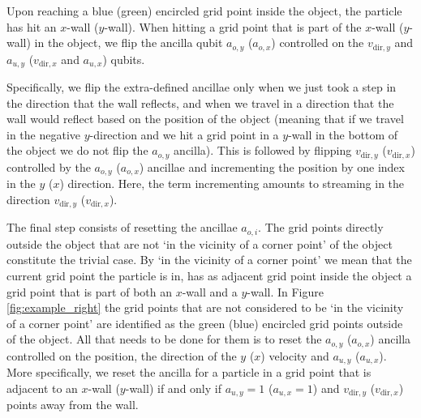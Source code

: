 Upon reaching a blue (green) encircled grid point inside the object, the particle has hit an $x$-wall ($y$-wall).
When hitting a grid point that is part of the $x$-wall ($y$-wall) in the object, we flip the ancilla qubit $a_{o,y}$ ($a_{o,x}$) controlled on the $v_{\text{dir},y}$ and $a_{u,y}$ ($v_{\text{dir},x}$ and $a_{u,x}$) qubits. %

Specifically, we flip the extra-defined ancillae only when we just took a step in the direction that the wall reflects, and when we travel in a direction that the wall would reflect based on the position of the object (meaning that if we travel in the negative $y$-direction and we hit a grid point in a $y$-wall in the bottom of the object we do not flip the $a_{o,y}$ ancilla).
This is followed by flipping $v_{\text{dir},y}$ ($v_{\text{dir},x}$) controlled by the $a_{o,y}$ ($a_{o,x}$) ancillae and incrementing the position by one index in the $y$ ($x$) direction. Here, the term incrementing amounts to streaming in the direction $v_{\text{dir},y}$ ($v_{\text{dir},x}$).




The final step consists of resetting the ancillae $a_{o,i}$. The grid points directly outside the object that are not `in the vicinity of a corner point' of the object constitute the trivial case. By `in the vicinity of a corner point' we mean that the current grid point the particle is in, has as adjacent grid point inside the object a grid point that is part of both an $x$-wall and a $y$-wall. In Figure \ref{fig:example_right} the grid points that are not considered to be `in the vicinity of a corner point' are identified as the green (blue) encircled grid points outside of the object. All that needs to be done for them is to reset the $a_{o,y}$ ($a_{o,x}$) ancilla controlled on the position, the direction of the $y$ ($x$) velocity and $a_{u,y}$ ($a_{u,x}$). More specifically, we reset the ancilla for a particle in a grid point that is adjacent to an $x$-wall ($y$-wall) if and only if $a_{u,y}=1$ ($a_{u,x}=1$) and $v_{\text{dir},y}$ ($v_{\text{dir},x}$) points away from the wall. 

